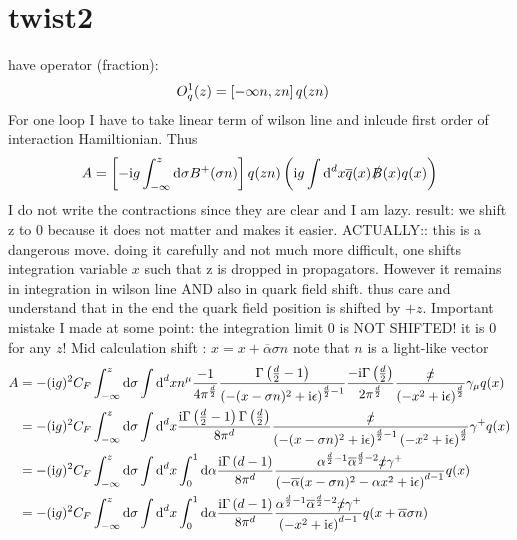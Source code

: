 \section{twist2}
have operator (fraction):
\begin{align}
O_q^{1}(z) 
&=
\left[-\infty n ,zn \right] q(zn)
\end{align}
For one loop I have to take linear term of wilson line and inlcude first order of interaction Hamiltionian. Thus
\begin{align}
	A=\left[-\text{i} g \int_{-\infty}^ {z} \text{d} \sigma B^+(\sigma n)\right] q(zn) \left(\text{i} g \int \text{d} ^d x \overline q(x) \slashed {B} (x) q(x)\right)
\end{align}
I do not write the contractions since they are clear and I am lazy. result: 
we shift z to 0 because it does not matter  and makes it easier. ACTUALLY:: this is a dangerous move. doing it carefully and not much more difficult, one shifts integration variable $x$ such that z is  dropped in propagators. However it remains in integration in wilson line AND also in quark field shift. thus care and understand that in the end the quark field position is shifted by $+z$. Important mistake I made at some point: the integration limit $0$ is NOT SHIFTED! it is $0$ for any $z$! Mid calculation shift : $x = x + \overline\alpha \sigma n$ note that $n$ is a light-like vector
\begin{align}
	A
	&=
	-(\text{i} g)^2C_F \int_{-\infty}^{z} \text{d} \sigma \int \text{d} ^d x n^\mu \frac{-1}{4\pi^{\frac{d}{2}}}\frac{\Gamma\left(\frac{d}{2}-1\right)}{\left(-(x-\sigma n)^2 + \text{i} \epsilon\right)^{\frac{d}{2}-1}}\frac{-\text{i} \Gamma\left(\frac{d}{2}\right)}{2\pi^{\frac{d}{2}}}\frac{\slashed x}{\left(-x^2+\text{i} \epsilon \right)^{\frac{d}{2}}}\gamma_\mu q(x)
	\\
	&=
	-(\text{i} g)^2C_F \int_{-\infty}^{z} \text{d} \sigma \int \text{d} ^d x \frac{\text{i}\Gamma\left(\frac{d}{2}-1\right) \Gamma\left(\frac{d}{2}\right)}{8\pi^{d}}\frac{\slashed x}{\left(-(x-\sigma n)^2 + \text{i} \epsilon\right)^{\frac{d}{2}-1}\left(-x^2+\text{i} \epsilon \right)^{\frac{d}{2}}}\gamma^+ q(x)
	\\
	&=
	-(\text{i} g)^2C_F \int_{-\infty}^{z} \text{d} \sigma \int \text{d} ^d x \int_0^1 \text{d} \alpha \frac{\text{i} \Gamma\left(d-1\right)}{8\pi^{d}}\frac{\alpha^{\frac{d}{2}-1} \overline \alpha^{\frac{d}{2}-2}\slashed x\gamma^+}{\left(-\overline \alpha(x-\sigma n)^2 -\alpha x^2+\text{i} \epsilon \right)^{d-1}} q(x)
	\\
	&=
	-(\text{i} g)^2C_F \int_{-\infty}^{z} \text{d} \sigma \int \text{d} ^d x \int_0^1 \text{d} \alpha \frac{\text{i} \Gamma\left(d-1\right)}{8\pi^{d}}\frac{\alpha^{\frac{d}{2}-1} \overline \alpha^{\frac{d}{2}-2}\slashed x\gamma^+}{\left(-x^2+\text{i} \epsilon\right)^{d-1}} q(x+\overline \alpha \sigma n )
\end{align}

